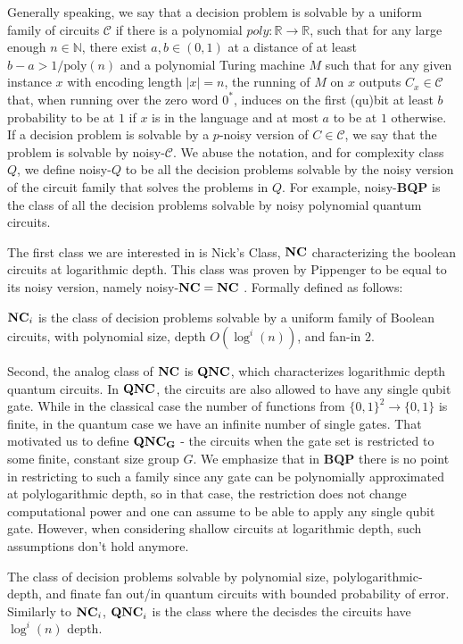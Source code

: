 \documentclass[manuscript,screen,review]{acmart}
\begin{document}
{  
  Generally speaking, we say that a decision problem is solvable by a uniform family of circuits $\mathcal{C}$ if there is a polynomial $poly : \mathbb{R} \rightarrow \mathbb{R}$, such that for any large enough $n \in \mathbb{N}$, there exist $a, b \in (0,1)$ at a distance of at least $b - a > 1/\text{poly}(n)$ and a polynomial Turing machine $M$ such that for any given instance $x$ with encoding length $|x| = n$, the running of $M$ on $x$ outputs $C_x \in \mathcal{C}$ that, when running over the zero word $0^{*}$, induces on the first (qu)bit at least $b$ probability to be at $1$ if $x$ is in the language and at most $a$ to be at $1$ otherwise. 
If a decision problem is solvable by a $p$-noisy version of $C \in \mathcal{C}$, we say that the problem is solvable by noisy-$\mathcal{C}$. We abuse the notation, and for complexity class $Q$, we define noisy-$Q$ to be all the decision problems solvable by the noisy version of the circuit family that solves the problems in $Q$. For example, noisy-\textbf{BQP} is the class of all the decision problems solvable by noisy polynomial quantum circuits.  


The first class we are interested in is Nick's Class, $\mathbf{NC}{}$  characterizing the boolean circuits at logarithmic depth. This class was proven by Pippenger to be equal to its noisy version, namely noisy-$\mathbf{NC}{} = \mathbf{NC}{}$ \cite{Pippenger}. Formally defined as follows: 
\begin{definition}
$\mathbf{NC}_i$ is the class of decision problems solvable by a uniform family of Boolean circuits, with polynomial size, depth $O(\log^i(n))$, and fan-in $2$. 
\end{definition}


Second, the analog class of $\mathbf{NC}{}$ is $\QNC{}$, which characterizes logarithmic depth quantum circuits. In $\QNC{}$, the circuits are also allowed to have any single qubit gate. While in the classical case the number of functions from $\{0,1\}^{2} \rightarrow \{0,1\}$ is finite, in the quantum case we have an infinite number of single gates. That motivated us to define $\mathbf{QNC_G}{}$ - the circuits when the gate set is restricted to some finite, constant size group $G$. We emphasize that in \textbf{BQP} there is no point in restricting to such a family since any gate can be polynomially approximated at polylogarithmic depth, so in that case, the restriction does not change computational power and one can assume to be able to apply any single qubit gate. However, when considering shallow circuits at logarithmic depth, such assumptions don't hold anymore.
\begin{definition}[$\QNC{}$]
  The class of decision problems solvable by polynomial size,  polylogarithmic-depth,  and finate fan out/in quantum circuits with bounded probability of error. Similarly to $\mathbf{NC}_i{}$, $\mathbf{QNC}_i{}$ is the class where the decisdes the circuits have $\log^i (n)$ depth.  
\end{definition}

}
\end{document}
